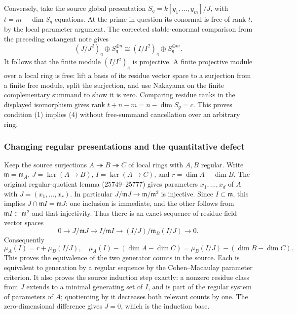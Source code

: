 Conversely, take the source global presentation \(S_g=k[y_1,\ldots,y_m]/J\), with \(t=m-\dim S_g\) equations. At the prime in question its conormal is free of rank \(t\), by the local parameter argument. The corrected stable-conormal comparison from the preceding cotangent note gives \[
(J/J^2)_{\mathfrak q}\oplus S_{\mathfrak q}^{\oplus n}
\cong (I/I^2)_{\mathfrak q}\oplus S_{\mathfrak q}^{\oplus m}.
\] It follows that the finite module \((I/I^2)_{\mathfrak q}\) is projective. A finite projective module over a local ring is free: lift a basis of its residue vector space to a surjection from a finite free module, split the surjection, and use Nakayama on the finite complementary summand to show it is zero. Comparing residue ranks in the displayed isomorphism gives rank \(t+n-m=n-\dim S_g=c\). This proves condition (1) implies (4) without free-summand cancellation over an arbitrary ring.

\subsubsection{Changing regular presentations and the quantitative defect}\label{changing-regular-presentations-and-the-quantitative-defect}

Keep the source surjections \(A\twoheadrightarrow B\twoheadrightarrow C\) of local rings with \(A,B\) regular. Write \(\mathfrak m=\mathfrak m_A\), \(J=\ker(A\to B)\), \(I=\ker(A\to C)\), and \(r=\dim A-\dim B\). The original regular-quotient lemma (25749--25777) gives parameters \(x_1,\ldots,x_d\) of \(A\) with \(J=(x_1,\ldots,x_r)\). In particular \(J/\mathfrak mJ\to\mathfrak m/\mathfrak m^2\) is injective. Since \(I\subset\mathfrak m\), this implies \(J\cap\mathfrak mI=\mathfrak mJ\): one inclusion is immediate, and the other follows from \(\mathfrak mI\subset\mathfrak m^2\) and that injectivity. Thus there is an exact sequence of residue-field vector spaces \[
0\to J/\mathfrak mJ\to I/\mathfrak mI
\to (I/J)/\mathfrak m_B(I/J)\to0.
\tag{1}
\] Consequently \[
\mu_A(I)=r+\mu_B(I/J),\quad
\mu_A(I)-(\dim A-\dim C)
=\mu_B(I/J)-(\dim B-\dim C).\tag{2}
\] This proves the equivalence of the two generator counts in the source. Each is equivalent to generation by a regular sequence by the Cohen--Macaulay parameter criterion. It also proves the source induction step exactly: a nonzero residue class from \(J\) extends to a minimal generating set of \(I\), and is part of the regular system of parameters of \(A\); quotienting by it decreases both relevant counts by one. The zero-dimensional difference gives \(J=0\), which is the induction base.

